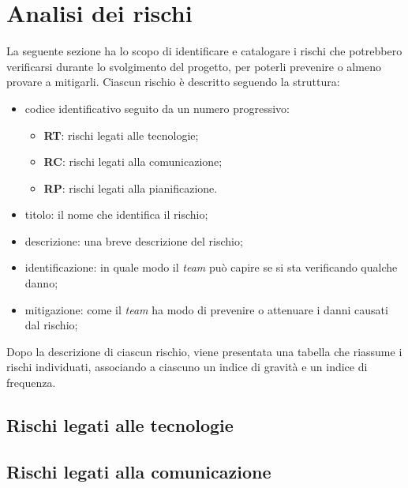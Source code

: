 \section{Analisi dei rischi}

La seguente sezione ha lo scopo di identificare e catalogare i rischi che
potrebbero verificarsi durante lo svolgimento del progetto, per poterli
prevenire o almeno provare a mitigarli.
Ciascun rischio è descritto seguendo la struttura:
\begin{itemize}
	\item codice identificativo seguito da un numero progressivo:
	      \begin{itemize}
		      \item \textbf{RT}: rischi legati alle tecnologie;
		      \item \textbf{RC}: rischi legati alla comunicazione;
		      \item \textbf{RP}: rischi legati alla pianificazione.
	      \end{itemize}

	\item titolo: il nome che identifica il rischio;

	\item descrizione: una breve descrizione del rischio;

	\item identificazione: in quale modo il \textit{team} può capire se si sta
	      verificando qualche danno;

	\item mitigazione: come il \textit{team} ha modo di prevenire o
	      attenuare i danni causati dal rischio;
\end{itemize}

Dopo la descrizione di ciascun rischio, viene presentata una tabella che
riassume i rischi individuati, associando a ciascuno un indice di gravità e un
indice di frequenza.

\subsection{Rischi legati alle tecnologie}




\subsection{Rischi legati alla comunicazione}




